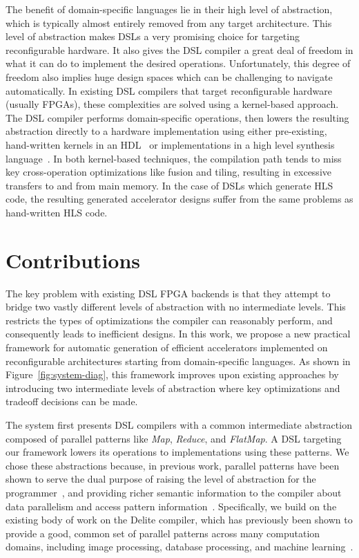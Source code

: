 The benefit of domain-specific languages lie in their
high level of abstraction, which is typically almost entirely removed from any target
architecture. This level of abstraction makes DSLs a very promising choice for targeting reconfigurable
hardware.
It also gives the DSL compiler a great deal of freedom in what it can do to implement the
desired operations. Unfortunately, this degree of freedom also implies huge design spaces
which can be challenging to navigate automatically.
In existing DSL compilers that target reconfigurable hardware (usually FPGAs),
these complexities are solved using a kernel-based approach.
The DSL compiler performs domain-specific operations, then lowers the resulting
abstraction directly to a hardware implementation using either pre-existing, hand-written kernels in
an HDL~\cite{TODO} or implementations in a high level synthesis language~\cite{george14fpl}.
In both kernel-based techniques, the compilation path tends to miss key cross-operation optimizations
like fusion and tiling, resulting in excessive transfers to and from main memory.
In the case of DSLs which generate HLS code, the resulting generated accelerator designs suffer from the
same problems as hand-written HLS code.

\section{Contributions}
The key problem with existing DSL FPGA backends is that they attempt
to bridge two vastly different levels of abstraction with no intermediate
levels. This restricts the types of optimizations the compiler can reasonably
perform, and consequently leads to inefficient designs.
In this work, we propose a new practical framework for automatic generation of
efficient accelerators implemented on reconfigurable architectures starting
from domain-specific languages. As shown in Figure~\ref{fig:system-diag}, this
framework improves upon existing approaches by introducing two intermediate levels of
abstraction where key optimizations and tradeoff decisions can be made.

The system first presents DSL compilers with a common intermediate abstraction composed of
parallel patterns like \emph{Map}, \emph{Reduce}, and \emph{FlatMap}.
A DSL targeting our framework lowers its operations to implementations using these patterns.
We chose these abstractions because, in previous work, parallel patterns have
been shown to serve the dual purpose of raising the
level of abstraction for the
programmer~\cite{ecoop13sujeeth,pldi13halide}, and providing richer
semantic information to the compiler about data parallelism
and access pattern information~\cite{delite-tecs14}.
Specifically, we build on the existing body of work
on the Delite compiler, which has previously been shown
to provide a good, common set of parallel patterns across many computation domains, including
image processing, database processing, and machine learning~\cite{pldi13halide,ecoop13sujeeth}.

